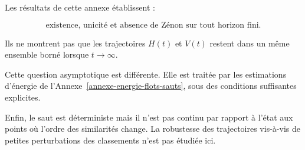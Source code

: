 Les résultats de cette annexe établissent :

\[
\boxed{
\text{existence, unicité et absence de Zénon sur tout horizon fini.}
}
\]

Ils ne montrent pas que les trajectoires \(H(t)\) et \(V(t)\) restent dans un même ensemble borné lorsque \(t\to\infty\).

Cette question asymptotique est différente. Elle est traitée par les estimations d'énergie de l'Annexe~\ref{annexe-energie-flots-sauts}, sous des conditions suffisantes explicites.

Enfin, le saut est déterministe mais il n'est pas continu par rapport à l'état aux points où l'ordre des similarités change. La robustesse des trajectoires vis-à-vis de petites perturbations des classements n'est pas étudiée ici.
